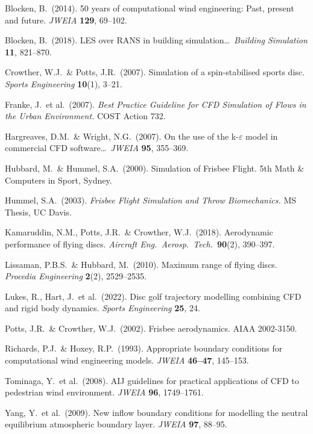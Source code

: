 \documentclass[11pt,letterpaper]{article}
\begin{document}
\begin{description}[font=\normalfont\itshape,leftmargin=1em]
  \item Blocken, B.\ (2014). 50 years of computational wind engineering: Past, present and future. \emph{JWEIA} \textbf{129}, 69--102.
  \item Blocken, B.\ (2018). LES over RANS in building simulation\ldots\ \emph{Building Simulation} \textbf{11}, 821--870.
  \item Crowther, W.J.\ \& Potts, J.R.\ (2007). Simulation of a spin-stabilised sports disc. \emph{Sports Engineering} \textbf{10}(1), 3--21.
  \item Franke, J.\ et al.\ (2007). \emph{Best Practice Guideline for CFD Simulation of Flows in the Urban Environment.} COST Action 732.
  \item Hargreaves, D.M.\ \& Wright, N.G.\ (2007). On the use of the k-$\varepsilon$ model in commercial CFD software\ldots\ \emph{JWEIA} \textbf{95}, 355--369.
  \item Hubbard, M.\ \& Hummel, S.A.\ (2000). Simulation of Frisbee Flight. 5th Math \& Computers in Sport, Sydney.
  \item Hummel, S.A.\ (2003). \emph{Frisbee Flight Simulation and Throw Biomechanics.} MS Thesis, UC Davis.
  \item Kamaruddin, N.M., Potts, J.R.\ \& Crowther, W.J.\ (2018). Aerodynamic performance of flying discs. \emph{Aircraft Eng.\ Aerosp.\ Tech.}\ \textbf{90}(2), 390--397.
  \item Lissaman, P.B.S.\ \& Hubbard, M.\ (2010). Maximum range of flying discs. \emph{Procedia Engineering} \textbf{2}(2), 2529--2535.
  \item Lukes, R., Hart, J.\ et al.\ (2022). Disc golf trajectory modelling combining CFD and rigid body dynamics. \emph{Sports Engineering} \textbf{25}, 24.
  \item Potts, J.R.\ \& Crowther, W.J.\ (2002). Frisbee\texttrademark{} aerodynamics. AIAA 2002-3150.
  \item Richards, P.J.\ \& Hoxey, R.P.\ (1993). Appropriate boundary conditions for computational wind engineering models. \emph{JWEIA} \textbf{46--47}, 145--153.
  \item Tominaga, Y.\ et al.\ (2008). AIJ guidelines for practical applications of CFD to pedestrian wind environment. \emph{JWEIA} \textbf{96}, 1749--1761.
  \item Yang, Y.\ et al.\ (2009). New inflow boundary conditions for modelling the neutral equilibrium atmospheric boundary layer. \emph{JWEIA} \textbf{97}, 88--95.
\end{description}
\end{document}
